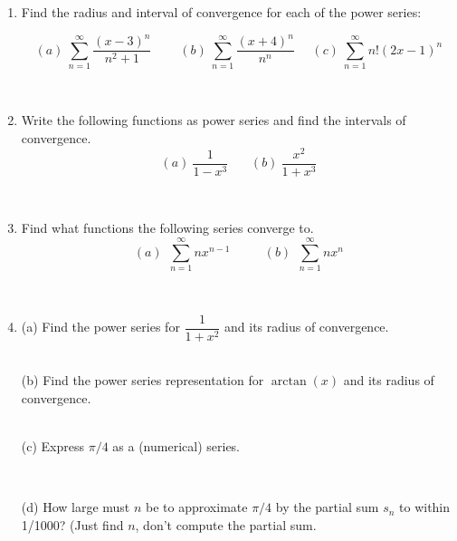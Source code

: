 \documentclass[11pt, oneside]{article}   	%
\title{}
\author{Week 12 discussion problems}
\date{}							%
\begin{document}
\maketitle

\begin{enumerate}
\item Find the radius and interval of convergence for each of the power series:

$$(a) \ \sum_{n=1}^{\infty} \dfrac{(x-3)^n}{n^2+1} \ \ \ \ \ \ \ \ \ \ (b) \ \sum_{n=1}^{\infty}  \dfrac{(x+4)^n}{n^n} \ \ \ \ \ \ (c) \ \sum_{n=1}^{\infty}  n!(2x-1)^n$$

\

\item Write the following functions as power series and find the intervals of convergence. $$ (a) \ \dfrac{1}{1-x^3} \ \ \ \ \ \ \ \ (b) \ \dfrac{x^2}{1+x^3} $$

\

\item Find what functions the following series converge to.
$$  (a) \ \ \sum_{n=1}^{\infty}  nx^{n-1} \ \ \ \ \ \ \ \ \ \ \ \ (b) \  \ \sum_{n=1}^{\infty} nx^n$$

\

\item (a) Find the power series for $\dfrac{1}{1+x^2}$ and its radius of convergence.\\

\

(b) Find the power series representation for $\arctan(x)$ and its radius of convergence.\\

\

(c) Express $\pi/4$ as a (numerical) series.

\

(d) How large must $n$ be to approximate $\pi/4$ by the partial sum $s_n$ to within 1/1000? (Just find $n$, don't compute the partial sum.





\end{enumerate}
\end{document}
